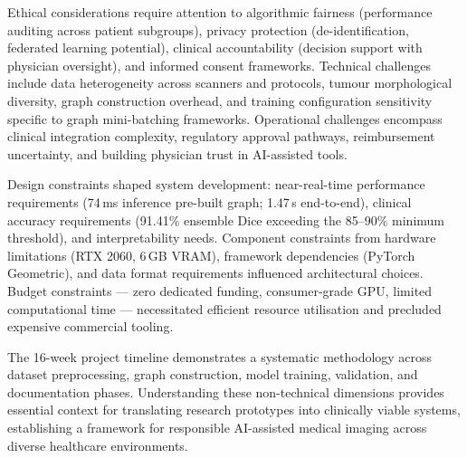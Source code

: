 Ethical considerations require attention to algorithmic fairness (performance auditing across patient subgroups), privacy protection (de-identification, federated learning potential), clinical accountability (decision support with physician oversight), and informed consent frameworks. Technical challenges include data heterogeneity across scanners and protocols, tumour morphological diversity, graph construction overhead, and training configuration sensitivity specific to graph mini-batching frameworks. Operational challenges encompass clinical integration complexity, regulatory approval pathways, reimbursement uncertainty, and building physician trust in AI-assisted tools.

Design constraints shaped system development: near-real-time performance requirements (74\,ms inference pre-built graph; 1.47\,s end-to-end), clinical accuracy requirements (91.41\% ensemble Dice exceeding the 85--90\% minimum threshold), and interpretability needs. Component constraints from hardware limitations (RTX 2060, 6\,GB VRAM), framework dependencies (PyTorch Geometric), and data format requirements influenced architectural choices. Budget constraints — zero dedicated funding, consumer-grade GPU, limited computational time — necessitated efficient resource utilisation and precluded expensive commercial tooling.

The 16-week project timeline demonstrates a systematic methodology across dataset preprocessing, graph construction, model training, validation, and documentation phases. Understanding these non-technical dimensions provides essential context for translating research prototypes into clinically viable systems, establishing a framework for responsible AI-assisted medical imaging across diverse healthcare environments.

\clearpage